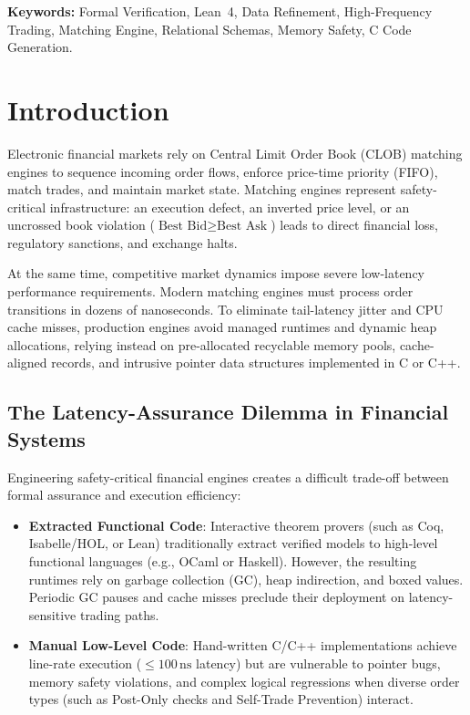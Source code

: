 \documentclass[11pt,a4paper]{article}
\begin{document}
\vspace{0.5em}
\noindent\textbf{Keywords:} Formal Verification, Lean~4, Data Refinement, High-Frequency Trading, Matching Engine, Relational Schemas, Memory Safety, C Code Generation.

\section{Introduction}
\label{sec:intro}

Electronic financial markets rely on Central Limit Order Book (CLOB) matching engines to sequence incoming order flows, enforce price-time priority (FIFO), match trades, and maintain market state. Matching engines represent safety-critical infrastructure: an execution defect, an inverted price level, or an uncrossed book violation ($\text{Best Bid} \ge \text{Best Ask}$) leads to direct financial loss, regulatory sanctions, and exchange halts.

At the same time, competitive market dynamics impose severe low-latency performance requirements. Modern matching engines must process order transitions in dozens of nanoseconds. To eliminate tail-latency jitter and CPU cache misses, production engines avoid managed runtimes and dynamic heap allocations, relying instead on pre-allocated recyclable memory pools, cache-aligned records, and intrusive pointer data structures implemented in C or C++.

\subsection{The Latency-Assurance Dilemma in Financial Systems}

Engineering safety-critical financial engines creates a difficult trade-off between formal assurance and execution efficiency:
\begin{itemize}[leftmargin=*]
    \item \textbf{Extracted Functional Code}: Interactive theorem provers (such as Coq, Isabelle/HOL, or Lean) traditionally extract verified models to high-level functional languages (e.g., OCaml or Haskell). However, the resulting runtimes rely on garbage collection (GC), heap indirection, and boxed values. Periodic GC pauses and cache misses preclude their deployment on latency-sensitive trading paths.
    \item \textbf{Manual Low-Level Code}: Hand-written C/C++ implementations achieve line-rate execution ($\le 100\,\text{ns}$ latency) but are vulnerable to pointer bugs, memory safety violations, and complex logical regressions when diverse order types (such as Post-Only checks and Self-Trade Prevention) interact.
\end{itemize}
\end{document}
